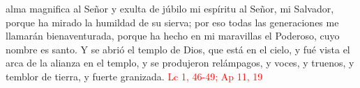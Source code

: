 alma magnifica al Señor y exulta de júbilo mi espíritu al Señor, mi Salvador, porque ha mirado la humildad de su sierva;
por eso todas las generaciones me llamarán bienaventurada, porque ha hecho en mi maravillas el Poderoso, cuyo nombre es santo. Y se abrió el templo de Dios, que está en el cielo,
y fué vista el arca de la alianza en el templo, y se produjeron relámpagos, y voces, y truenos, y temblor de tierra, y fuerte granizada. \textcolor{red}{Lc 1, 46-49; Ap 11, 19}